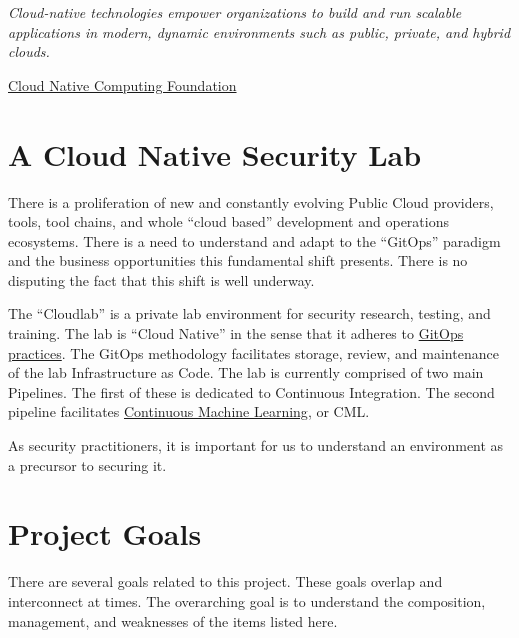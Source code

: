 






\begin{displayquote}
	\emph{Cloud-native technologies empower organizations to build and run scalable applications in modern, dynamic environments such as public,
	private, and hybrid clouds.}
	
	\href{https://www.cncf.io/about/who-we-are/}{Cloud Native Computing Foundation}
\end{displayquote}

\section{\label{sec:Start}A Cloud Native Security Lab}
\vspace{2mm}
\justifying
There is a proliferation of new and constantly evolving Public Cloud providers, tools, tool chains, and whole 
``cloud based'' development and operations ecosystems. There is a need to understand and adapt to the ``GitOps'' paradigm and the
business opportunities this fundamental shift presents. There is no disputing the fact that this shift is well underway\cite{CloudShift}. 

\justifying
The ``Cloudlab'' is a private lab environment for security research, testing, and training. The lab is ``Cloud Native'' in the sense that it
adheres to \href{https://www.cloudbees.com/gitops/what-is-gitops}{GitOps practices}. The GitOps methodology facilitates storage, review, and
maintenance of the lab Infrastructure as Code. The lab is currently comprised of two main Pipelines. The first of these is dedicated to Continuous
Integration. The second pipeline facilitates \href{https://cml.dev/doc}{Continuous Machine Learning}, or CML\cite{books/mit/026233758}.

\justifying
As security practitioners, it is important for us to understand an environment as a precursor to securing it.

\section{\label{sec:Project}Project Goals}
\vspace{2mm}
\justifying
There are several goals related to this project. These goals overlap and interconnect at times. The overarching goal is to understand the composition,
management, and weaknesses of the items listed here.

